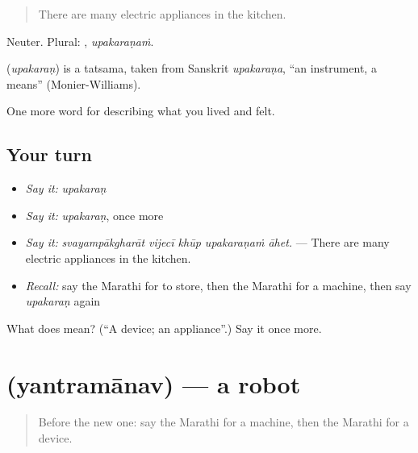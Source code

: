 \begin{quote}
There are many electric appliances in the kitchen.
\end{quote}

Neuter. Plural: , \emph{upakaraṇaṁ}.

\begin{cousinweb}
\textbf{} (\emph{upakaraṇ}) is a tatsama, taken from Sanskrit \emph{upakaraṇa}, \textquotedblleft{}an instrument, a means\textquotedblright{} (Monier-Williams).
\end{cousinweb}

\begin{grammarlens}[title={What you've built}]
One more word for describing what you lived and felt.
\end{grammarlens}

\subsection*{Your turn}
\begin{itemize}
\raggedright
  \item \emph{Say it:} \emph{upakaraṇ}
  \item \emph{Say it:} \emph{upakaraṇ}, once more
  \item \emph{Say it:} \emph{svayampākgharāt vijecī khūp upakaraṇaṁ āhet.} — There are many electric appliances in the kitchen.
  \item \emph{Recall:} say the Marathi for to store, then the Marathi for a machine, then say \emph{upakaraṇ} again
\end{itemize}

\begin{tcolorbox}[breakable,colback=teal!4,colframe=teal!35!black,title={Before you move on}]
What does  mean? (\textquotedblleft{}A device; an appliance\textquotedblright{}.) Say it once more.
\end{tcolorbox}
\section[\texorpdfstring{\mr{यंत्रमानव} (yantramānav)}{यंत्रमानव (yantramānav)}]{ (yantramānav) — a robot}

\label{lesson:MR-C518-yantramanav}



\begin{quote}
Before the new one: say the Marathi for a machine, then the Marathi for a device.
\end{quote}

